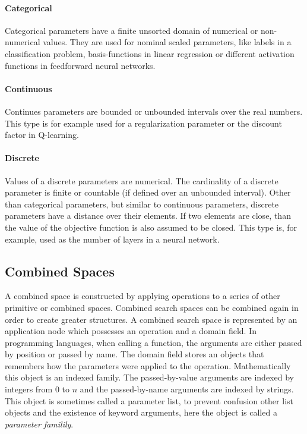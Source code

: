 \documentclass[english]{article}
\begin{document}
\paragraph{Categorical}
Categorical parameters have a finite unsorted domain of numerical or non-numerical values. They are used for nominal scaled parameters, like labels in a classification problem, basis-functions in linear regression or different activation functions in feedforward neural networks.

\paragraph{Continuous}
Continues parameters are bounded or unbounded intervals over the real numbers. This type is for example used for a regularization parameter or the discount factor in Q-learning.

\paragraph{Discrete}
Values of a discrete parameters are numerical. The cardinality of a discrete parameter is finite or countable (if defined over an unbounded interval).
Other than categorical parameters, but similar to continuous parameters, discrete parameters have a distance over their elements. If two elements are close, than the value of the objective function is also assumed to be closed. This type is, for example, used as the number of layers in a neural network.

\subsection{Combined Spaces}
A combined space is constructed by applying operations to a series of other primitive or combined spaces. Combined search spaces can be combined again in order to create greater structures. A combined search space is represented by an application node which possesses an operation and a domain field. In programming languages, when calling a function, the arguments are either passed by position or passed by name. The domain field stores an objects that remembers how the parameters were applied to the operation. Mathematically this object is an indexed family. The passed-by-value arguments are indexed by integers from $0$ to $n$ and the passed-by-name arguments are indexed by strings. This object is sometimes called a parameter list, to prevent confusion other list objects and the existence of keyword arguments, here the object is called a \textit{parameter familily}.
\end{document}
